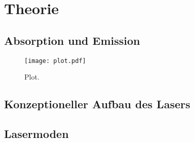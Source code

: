 \section{Theorie}
\label{sec:Theorie}


\subsection{Absorption und Emission}
\label{subsec:absorption_und_emission}

\begin{figure}
  \centering
  \texttt{[image: plot.pdf]}
  \caption{Plot. \cite{sample}}
  \label{fig:plot}
\end{figure}


\subsection{Konzeptioneller Aufbau des Lasers}
\label{subsec:konzeptioneller_aufbau}


\subsection{Lasermoden}
\label{subsec:lasermoden}
